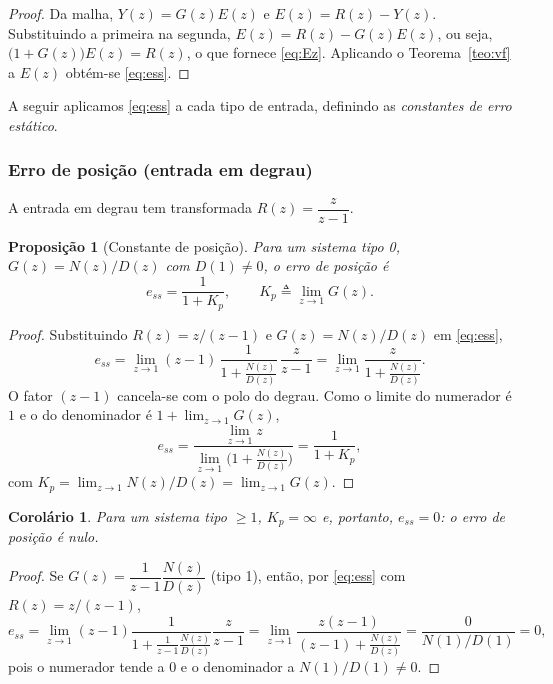 \documentclass[11pt,a4paper,oneside]{book}
\theoremstyle{definition}
\theoremstyle{plain}
\newtheorem{proposicao}{Proposição}[chapter]
\newtheorem{corolario}{Corolário}[chapter]
\begin{document}
\begin{proof}
Da malha, $Y(z)=G(z)E(z)$ e $E(z)=R(z)-Y(z)$. Substituindo a primeira na
segunda, $E(z)=R(z)-G(z)E(z)$, ou seja, $\big(1+G(z)\big)E(z)=R(z)$, o que
fornece \eqref{eq:Ez}. Aplicando o Teorema~\ref{teo:vf} a $E(z)$ obtém-se
\eqref{eq:ess}.
\end{proof}

A seguir aplicamos \eqref{eq:ess} a cada tipo de entrada, definindo as
\emph{constantes de erro estático}.

\subsubsection{Erro de posição (entrada em degrau)}

A entrada em degrau tem transformada $R(z)=\dfrac{z}{z-1}$.

\begin{proposicao}[Constante de posição]
\label{prop:Kp}
Para um sistema tipo 0, $G(z)=N(z)/D(z)$ com $D(1)\neq 0$, o erro de posição é
\begin{equation}
    e_{ss}=\frac{1}{1+K_p},\qquad
    K_p\triangleq\lim_{z\to 1}G(z).
    \label{eq:Kp}
\end{equation}
\end{proposicao}

\begin{proof}
Substituindo $R(z)=z/(z-1)$ e $G(z)=N(z)/D(z)$ em \eqref{eq:ess},
\[
e_{ss}=\lim_{z\to 1}(z-1)\,\frac{1}{1+\frac{N(z)}{D(z)}}\,\frac{z}{z-1}
      =\lim_{z\to 1}\frac{z}{1+\frac{N(z)}{D(z)}}.
\]
O fator $(z-1)$ cancela-se com o polo do degrau. Como o limite do numerador é
$1$ e o do denominador é $1+\lim_{z\to1}G(z)$,
\[
e_{ss}=\frac{\displaystyle\lim_{z\to1}z}{\displaystyle\lim_{z\to1}\big(1+\tfrac{N(z)}{D(z)}\big)}
      =\frac{1}{1+K_p},
\]
com $K_p=\lim_{z\to1}N(z)/D(z)=\lim_{z\to1}G(z)$.
\end{proof}

\begin{corolario}
Para um sistema tipo $\ge 1$, $K_p=\infty$ e, portanto, $e_{ss}=0$: o erro de
posição é nulo.
\end{corolario}

\begin{proof}
Se $G(z)=\dfrac{1}{z-1}\dfrac{N(z)}{D(z)}$ (tipo 1), então, por \eqref{eq:ess}
com $R(z)=z/(z-1)$,
\[
e_{ss}=\lim_{z\to1}(z-1)\frac{1}{1+\frac{1}{z-1}\frac{N(z)}{D(z)}}\frac{z}{z-1}
      =\lim_{z\to1}\frac{z(z-1)}{(z-1)+\frac{N(z)}{D(z)}}
      =\frac{0}{N(1)/D(1)}=0,
\]
pois o numerador tende a $0$ e o denominador a $N(1)/D(1)\neq 0$.
\end{proof}
\end{document}
